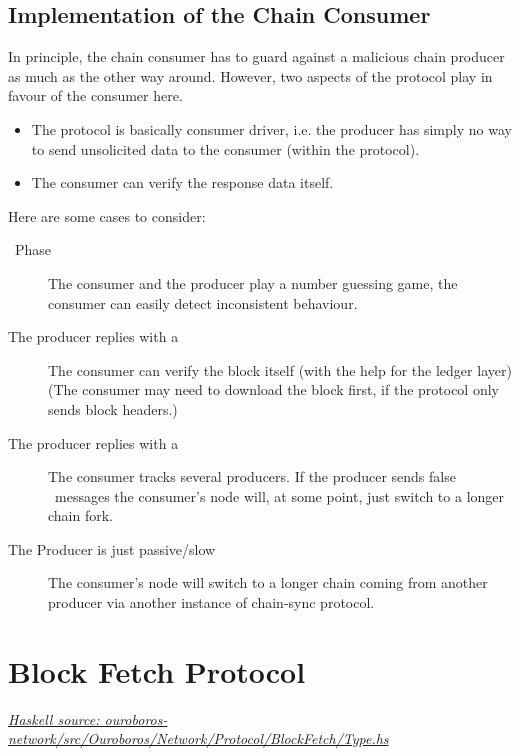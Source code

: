 \documentclass{report}
\newcommand{\hsref}[1]{\href{https://github.com/input-output-hk/ouroboros-network/blob/master/#1}{\emph{Haskell source: #1}}}
\newcommand{\wip}[1]{\color{magenta}{#1}\color{black}}
\newcommand{\state}[1]{\texttt{#1}}
\newcommand{\msg}[1]{\texttt{#1}}
\newcommand{\Idle}{\state{Idle}}
\newcommand{\Busy}{\state{Busy}}
\newcommand{\Done}{\state{Done}}
\theoremstyle{definition}{
  \newtheorem{lemma}{Lemma}[section] %
  \newtheorem{definition}[lemma]{Definition}
}
\theoremstyle{theorem}{
  \newtheorem{invariant}[lemma]{Invariant}
  \newtheorem{proofobligation}[lemma]{Proof Obligation}
}
\numberwithin{equation}{lemma}
\begin{document}
\subsection{Implementation of the Chain Consumer}
In principle, the chain consumer has to guard against a malicious chain producer
as much as the other way around.
However, two aspects of the protocol play in favour of the consumer here.
\begin{itemize}
  \item The protocol is basically consumer driver, i.e. the producer has simply no way to send unsolicited
data to the consumer (within the protocol).
  \item The consumer can verify the response data itself.
\end{itemize}
Here are some cases to consider:
\begin{description}
\item[\FindIntersect~Phase] The consumer and the producer play a number guessing game, the consumer can easily detect inconsistent behaviour.
\item[The producer replies with a \RollForward] The consumer can verify the block itself
  (with the help for the ledger layer)
  (The consumer may need to download the block first, if the protocol only sends block headers.)
\item[The producer replies with a \RollBackward] The consumer tracks several producers.
  If the producer sends false \RollBackward~messages the consumer's node
  will, at some point, just switch to a longer chain fork.
\item[The Producer is just passive/slow] The consumer's node will switch to
  a longer chain coming from another producer via another instance of
    chain-sync protocol.
\end{description}
\wip{This should be explained in detail}

\section{Block Fetch Protocol}
\label{block-fetching-protocol}

\hsref{ouroboros-network/src/Ouroboros/Network/Protocol/BlockFetch/Type.hs}
\renewcommand{\Idle}{\state{Idle}}
\renewcommand{\Busy}{\state{Busy}}
\newcommand{\Streaming}{\state{Streaming}}
\renewcommand{\Done}{\state{Done}}
\newcommand{\RequestRange}{\msg{RequestRange}}
\newcommand{\StartBatch}{\msg{StartBatch}}
\newcommand{\NoBlocks}{\msg{NoBlocks}}
\newcommand{\Block}{\msg{Block}}
\newcommand{\BatchDone}{\msg{BatchDone}}
\newcommand{\ClientDone}{\msg{ClientDone}}
\end{document}
